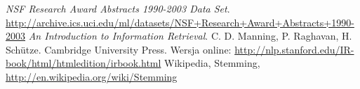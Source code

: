 \documentclass[a4paper,12pt]{article}
\begin{document}
\begin{thebibliography}{9}

   \emph{NSF Research Award Abstracts 1990-2003 Data Set}.
   \url{http://archive.ics.uci.edu/ml/datasets/NSF+Research+Award+Abstracts+1990-2003}
	\emph{An Introduction to Information Retrieval}. 
	C. D. Manning, P. Raghavan, H. Sch\"utze.
	Cambridge University Press.
	Wersja online: \url{http://nlp.stanford.edu/IR-book/html/htmledition/irbook.html}
	Wikipedia, Stemming, \url{http://en.wikipedia.org/wiki/Stemming}

\end{thebibliography}
\end{document}
